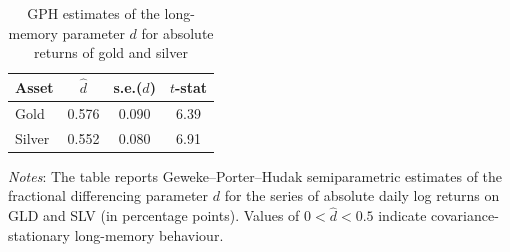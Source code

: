 \begin{table}[H]
  \centering
  \caption{GPH estimates of the long-memory parameter $d$ for absolute returns of gold and silver}
  \label{tab:arfima-gph}
  \begin{tabular}{lccc}
    \toprule
    Asset & $\hat{d}$ & s.e.($\hat{d}$) & $t$-stat \\
    \midrule
    Gold & 0.576 & 0.090 & 6.39 \\
    Silver & 0.552 & 0.080 & 6.91 \\
    \bottomrule
  \end{tabular}
  \vspace{0.2cm}
  \begin{minipage}{0.9\textwidth}
  \footnotesize
  \textit{Notes}: The table reports Geweke--Porter--Hudak semiparametric estimates   of the fractional differencing parameter $d$ for the series of absolute daily log returns   on GLD and SLV (in percentage points). Values of $0 < \hat{d} < 0.5$ indicate   covariance-stationary long-memory behaviour.
  \end{minipage}
\end{table}
